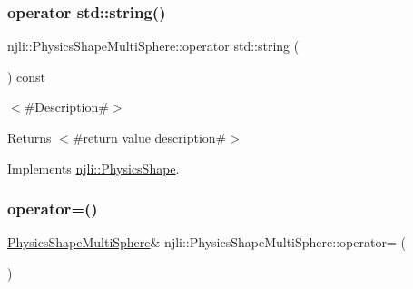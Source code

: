 \subsubsection{\texorpdfstring{operator std\+::string()}{operator std::string()}}
{\footnotesize\ttfamily njli\+::\+Physics\+Shape\+Multi\+Sphere\+::operator std\+::string (\begin{DoxyParamCaption}{ }\end{DoxyParamCaption}) const\hspace{0.3cm}{\ttfamily [virtual]}}

$<$\#\+Description\#$>$

\begin{DoxyReturn}{Returns}
$<$\#return value description\#$>$ 
\end{DoxyReturn}


Implements \mbox{\hyperlink{classnjli_1_1_physics_shape_a890d915f88af06dcf1ac1fa4f5943dc2}{njli\+::\+Physics\+Shape}}.

\mbox{\label{classnjli_1_1_physics_shape_multi_sphere_aea1e4639bb29535b236e1e56b90f9e44}} 
\subsubsection{\texorpdfstring{operator=()}{operator=()}}
{\footnotesize\ttfamily \mbox{\hyperlink{classnjli_1_1_physics_shape_multi_sphere}{Physics\+Shape\+Multi\+Sphere}}\& njli\+::\+Physics\+Shape\+Multi\+Sphere\+::operator= (\begin{DoxyParamCaption}\item[{const \mbox{\hyperlink{classnjli_1_1_physics_shape_multi_sphere}{Physics\+Shape\+Multi\+Sphere}} \&}]{ }\end{DoxyParamCaption})\hspace{0.3cm}{\ttfamily [protected]}}

\mbox{\label{classnjli_1_1_physics_shape_multi_sphere_a3bb2481f06e880597dafdb8c9da1a54b}} 
